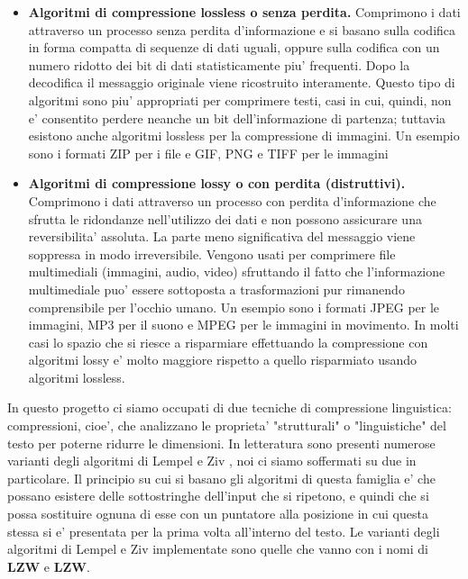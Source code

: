 \documentclass[a4paper,11pt]{article}
\theoremstyle{definition}
\begin{document}
\begin{itemize}
	\item \textbf{Algoritmi di compressione lossless o senza perdita.} Comprimono i dati attraverso un processo senza perdita d'informazione e si basano
	sulla codifica in forma compatta di sequenze di dati uguali, oppure sulla codifica con un numero ridotto dei bit di dati statisticamente piu' frequenti. Dopo la decodifica il messaggio originale viene ricostruito interamente. Questo tipo di algoritmi sono piu' appropriati per comprimere testi, casi in cui, quindi, non e' consentito perdere neanche un bit dell'informazione di partenza; tuttavia esistono anche algoritmi lossless per la compressione di immagini. Un esempio sono i formati ZIP per i file e GIF, PNG e TIFF per le immagini
	\item \textbf{Algoritmi di compressione lossy o con perdita (distruttivi).} Comprimono i dati attraverso un processo con perdita d'informazione che sfrutta le ridondanze nell'utilizzo dei dati e non possono assicurare una reversibilita' assoluta.	La parte meno significativa del messaggio viene soppressa in modo irreversibile. Vengono usati per comprimere file multimediali (immagini, audio, video) sfruttando il fatto che l'informazione multimediale puo' essere sottoposta a trasformazioni pur rimanendo comprensibile per l'occhio umano. Un esempio sono i formati JPEG per le immagini, MP3 per il suono e MPEG per le immagini in movimento. In molti casi lo spazio che si riesce a risparmiare effettuando la compressione con algoritmi lossy e' molto maggiore rispetto a quello risparmiato usando algoritmi lossless.

\end{itemize}
In questo progetto ci siamo occupati di due tecniche di compressione linguistica: compressioni, cioe', che analizzano le proprieta' "strutturali" o "linguistiche" del testo per poterne ridurre le dimensioni. In letteratura sono presenti numerose varianti degli algoritmi di Lempel e Ziv \cite{bookcompression}, noi ci siamo soffermati su due in particolare. Il principio su cui si basano gli algoritmi di questa famiglia e' che possano esistere delle sottostringhe dell'input che si ripetono, e quindi che si possa sostituire ognuna di esse con un puntatore alla posizione in cui questa stessa si e' presentata per la prima volta all'interno del testo. 
\newline \newline
\noindent Le varianti degli algoritmi di Lempel e Ziv implementate sono quelle che vanno con i nomi di \textbf{LZW} e \textbf{LZW}.
\end{document}
